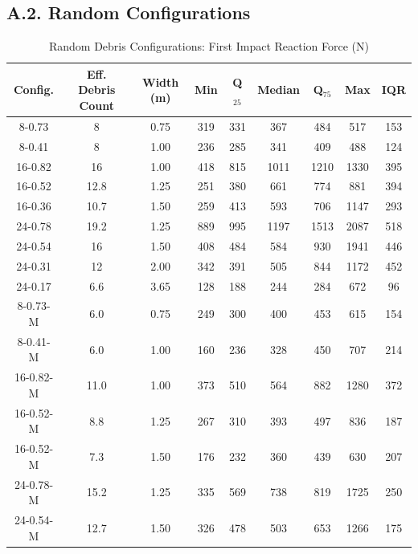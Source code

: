 \documentclass[10pt,a4paper]{article}
\begin{document}
\subsection*{A.2. Random Configurations}

\begin{table}[H]
\centering
\caption{Random Debris Configurations: First Impact Reaction Force (N)}
\label{tab:data-ran-FI} 
\begin{tabular}{ccccccccc}
\toprule
\textbf{Config.} & \textbf{Eff. Debris Count} & \textbf{Width (m)} & \textbf{Min} & \textbf{Q$_{25}$} & \textbf{Median} & \textbf{Q$_{75}$} & \textbf{Max} & \textbf{IQR} \\
\midrule
8-0.73     & 8   & 0.75 & 319 & 331 & 367 & 484 & 517 & 153 \\
8-0.41     & 8   & 1.00 & 236 & 285 & 341 & 409 & 488 & 124 \\
16-0.82    & 16  & 1.00 & 418 & 815 & 1011 & 1210 & 1330 & 395 \\
16-0.52    & 12.8  & 1.25 & 251 & 380 & 661 & 774 & 881 & 394 \\
16-0.36    & 10.7 & 1.50 & 259 & 413 & 593 & 706 & 1147 & 293 \\
24-0.78    & 19.2   & 1.25 & 889 & 995 & 1197 & 1513 & 2087 & 518 \\
24-0.54    & 16  & 1.50 & 408 & 484 & 584 & 930 & 1941 & 446 \\
24-0.31    & 12  & 2.00 & 342 & 391 & 505 & 844 & 1172 & 452 \\
24-0.17    & 6.6  & 3.65 & 128 & 188 & 244 & 284 & 672 & 96 \\
8-0.73-M   & 6.0  & 0.75 & 249 & 300 & 400 & 453 & 615 & 154 \\
8-0.41-M   & 6.0  & 1.00 & 160 & 236 & 328 & 450 & 707 & 214 \\
16-0.82-M  & 11.0 & 1.00 & 373 & 510 & 564 & 882 & 1280 & 372 \\
16-0.52-M  & 8.8  & 1.25 & 267 & 310 & 393 & 497 & 836 & 187 \\
16-0.52-M  & 7.3  & 1.50 & 176 & 232 & 360 & 439 & 630 & 207 \\
24-0.78-M  & 15.2 & 1.25 & 335 & 569 & 738 & 819 & 1725 & 250 \\
24-0.54-M  & 12.7 & 1.50 & 326 & 478 & 503 & 653 & 1266 & 175 \\
\bottomrule
\end{tabular}
\end{table}
\end{document}
